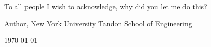 \large


To all people I wish to acknowledge, why did you let me do this?


\bigskip\medskip

\noindent \hfill Author, New York University Tandon School of Engineering

\hfill \today


